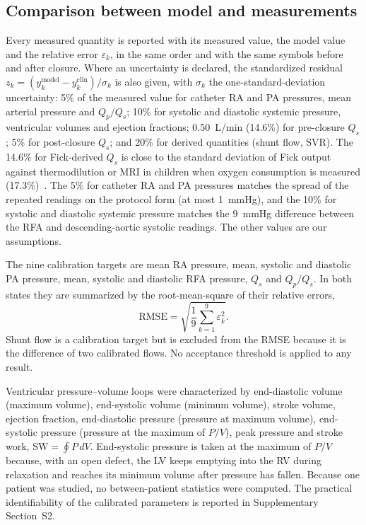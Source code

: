 \documentclass{article}
\begin{document}
\FloatBarrier
\subsection{Comparison between model and measurements}
\label{sec:comparison}
\label{sec:statistics}
Every measured quantity is reported with its measured value, the model value and the relative error $\varepsilon_k$, in the same order and with the same symbols before and after closure. Where an uncertainty is declared, the standardized residual $z_k = (y_k^{\mathrm{model}} - y_k^{\mathrm{clin}})/\sigma_k$ is also given, with $\sigma_k$ the one-standard-deviation uncertainty: 5\% of the measured value for catheter RA and PA pressures, mean arterial pressure and $Q_p/Q_s$; 10\% for systolic and diastolic systemic pressure, ventricular volumes and ejection fractions; 0.50~L/min (14.6\%) for pre-closure $Q_s$; 5\% for post-closure $Q_s$; and 20\% for derived quantities (shunt flow, SVR). The 14.6\% for Fick-derived $Q_s$ is close to the standard deviation of Fick output against thermodilution or MRI in children when oxygen consumption is measured (17.3\%)~\cite{Ralston2023}. The 5\% for catheter RA and PA pressures matches the spread of the repeated readings on the protocol form (at most 1~mmHg), and the 10\% for systolic and diastolic systemic pressure matches the 9~mmHg difference between the RFA and descending-aortic systolic readings. The other values are our assumptions.

The nine calibration targets are mean RA pressure, mean, systolic and diastolic PA pressure, mean, systolic and diastolic RFA pressure, $Q_s$ and $Q_p/Q_s$. In both states they are summarized by the root-mean-square of their relative errors,
\begin{equation}
\mathrm{RMSE} = \sqrt{\frac{1}{9}\sum_{k=1}^{9}\varepsilon_k^{2}}.
\label{eq:rmse}
\end{equation}
Shunt flow is a calibration target but is excluded from the RMSE because it is the difference of two calibrated flows. No acceptance threshold is applied to any result.

Ventricular pressure--volume loops were characterized by end-diastolic volume (maximum volume), end-systolic volume (minimum volume), stroke volume, ejection fraction, end-diastolic pressure (pressure at maximum volume), end-systolic pressure (pressure at the maximum of $P/V$), peak pressure and stroke work, $\mathrm{SW} = \oint P\,dV$. End-systolic pressure is taken at the maximum of $P/V$ because, with an open defect, the LV keeps emptying into the RV during relaxation and reaches its minimum volume after pressure has fallen. Because one patient was studied, no between-patient statistics were computed. The practical identifiability of the calibrated parameters is reported in Supplementary Section~S2.
\end{document}
